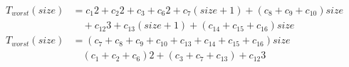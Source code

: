 \begin{subequations}
\label{eq:analyse-arlabeling-sortlabels-initlabelmemory}
\begin{align}
\label{eq:analyse-arlabeling-sortlabels-initlabelmemory-1}
T_{worst}(\mathit{size})& = c_{1}2 + c_{2}2 + c_{3} + c_{6}2 + c_{7}(\mathit{size} + 1) + (c_{8} + c_{9}
 + c_{10})\mathit{size} \\
& \quad + c_{12}3 + c_{13}(\mathit{size} + 1) + (c_{14} + c_{15} + c_{16})\mathit{size} \nonumber \\
\label{eq:analyse-arlabeling-sortlabels-initlabelmemory-2}
T_{worst}(\mathit{size})& = (c_{7} + c_{8} + c_{9} + c_{10} + c_{13} + c_{14} + c_{15} + c_{16})\mathit{size} \\
& \quad (c_{1} + c_{2} + c_{6})2 + (c_{3} + c_{7} + c_{13}) + c_{12}3 \nonumber
\end{align}
\end{subequations}
